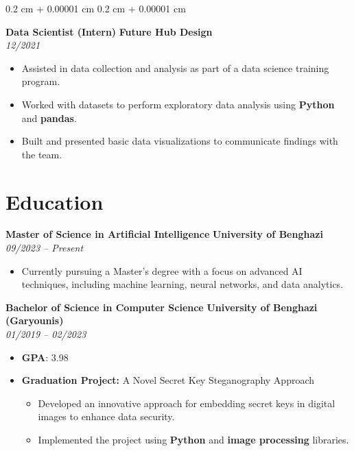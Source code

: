 \documentclass[10pt, letterpaper]{article}
\newenvironment{highlightsforbulletentries}{
    \begin{itemize}[
        topsep=0.10 cm,
        parsep=0.10 cm,
        partopsep=0pt,
        itemsep=0pt,
        leftmargin=10pt
    ]
}{
    \end{itemize}
} %
\newenvironment{onecolentry}{
    \begin{adjustwidth}{
        0.2 cm + 0.00001 cm
    }{
        0.2 cm + 0.00001 cm
    }
}{
    \end{adjustwidth}
} %
\begin{document}
\begin{onecolentry}
\begin{highlightsforbulletentries}
        \vspace{0.2 cm}
\noindent\textbf{Data Scientist (Intern)} \hfill \textbf{Future Hub Design} \\
\textit{12/2021} \\
\begin{itemize}
    \item Assisted in data collection and analysis as part of a data science training program.
    \item Worked with datasets to perform exploratory data analysis using \textbf{Python} and \textbf{pandas}.
    \item Built and presented basic data visualizations to communicate findings with the team.
\end{itemize}
        \vspace{0.2 cm}




        \end{highlightsforbulletentries}
    \end{onecolentry}
        \vspace{0.2 cm}
    \section{Education}
      \vspace{1 cm}
\noindent\textbf{Master of Science in Artificial Intelligence} \hfill \textbf{University of Benghazi} \\
\textit{09/2023 – Present} \\
\begin{itemize}
    \item Currently pursuing a Master's degree with a focus on advanced AI techniques, including machine learning, neural networks, and data analytics.
\end{itemize}
      \vspace{0.3 cm}

\noindent\textbf{Bachelor of Science in Computer Science} \hfill \textbf{University of Benghazi (Garyounis)} \\
\textit{01/2019 – 02/2023} \\
\begin{itemize}
    \item \textbf{GPA}: 3.98
    \item \textbf{Graduation Project:} A Novel Secret Key Steganography Approach
    \begin{itemize}
        \item Developed an innovative approach for embedding secret keys in digital images to enhance data security.
        \item Implemented the project using \textbf{Python} and \textbf{image processing} libraries.
    \end{itemize}
\end{itemize}
\end{document}
